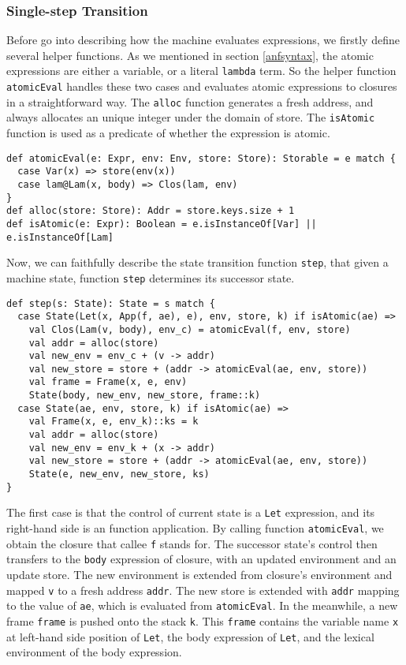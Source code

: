 \documentclass[acmsmall,review,anonymous]{acmart}\settopmatter{printfolios=true,printccs=false,printacmref=false}
\begin{document}
\subsubsection{Single-step Transition}
Before go into describing how the machine evaluates expressions, we firstly define several helper functions.
As we mentioned in section \ref{anfsyntax}, the atomic expressions are either a variable, or
a literal \texttt{lambda} term. So the helper function \texttt{atomicEval} handles these two
cases and evaluates atomic expressions to closures in a straightforward way.
The \texttt{alloc} function generates a fresh address, and always allocates an unique integer under the domain
of store.
The \texttt{isAtomic} function is used as a predicate of whether the expression is atomic.

\begin{verbatim}
def atomicEval(e: Expr, env: Env, store: Store): Storable = e match {
  case Var(x) => store(env(x))
  case lam@Lam(x, body) => Clos(lam, env)
}
def alloc(store: Store): Addr = store.keys.size + 1
def isAtomic(e: Expr): Boolean = e.isInstanceOf[Var] || e.isInstanceOf[Lam]
\end{verbatim}

Now, we can faithfully describe the state transition function \texttt{step},
that given a machine state, function \texttt{step} determines its successor state.

\begin{verbatim}
def step(s: State): State = s match {
  case State(Let(x, App(f, ae), e), env, store, k) if isAtomic(ae) =>
    val Clos(Lam(v, body), env_c) = atomicEval(f, env, store)
    val addr = alloc(store)
    val new_env = env_c + (v -> addr)
    val new_store = store + (addr -> atomicEval(ae, env, store))
    val frame = Frame(x, e, env)
    State(body, new_env, new_store, frame::k)
  case State(ae, env, store, k) if isAtomic(ae) =>
    val Frame(x, e, env_k)::ks = k
    val addr = alloc(store)
    val new_env = env_k + (x -> addr)
    val new_store = store + (addr -> atomicEval(ae, env, store))
    State(e, new_env, new_store, ks)
}
\end{verbatim}

The first case is that the control of current state is a \texttt{Let} expression,
and its right-hand side is an function application.
By calling function \texttt{atomicEval}, we obtain the closure that callee \texttt{f} stands for.
The successor state's control then transfers to the \texttt{body} expression of closure,
with an updated environment and an update store. The new environment is extended
from closure's environment and mapped \texttt{v} to a fresh address \texttt{addr}.
The new store is extended with \texttt{addr} mapping to the value of \texttt{ae},
which is evaluated from \texttt{atomicEval}.
In the meanwhile, a new frame \texttt{frame} is pushed onto the stack \texttt{k}.
This \texttt{frame} contains the variable name \texttt{x} at left-hand side position of \texttt{Let},
the body expression of \texttt{Let}, and the lexical environment of the body expression.
\end{document}
